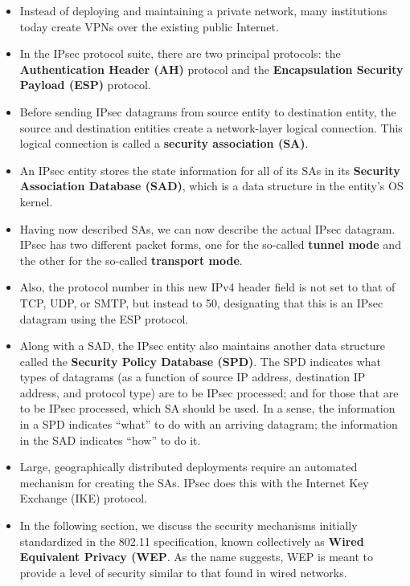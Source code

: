 \begin{itemize}
\item
Instead of deploying and maintaining a private network, many institutions today create VPNs over the existing public Internet.

\item
In the IPsec protocol suite, there are two principal protocols: the \textbf{Authentication Header (AH)} protocol and the \textbf{Encapsulation Security Payload (ESP)} protocol.

\item
Before sending IPsec datagrams from source entity to destination entity, the source and destination entities create a network-layer logical connection. This logical connection is called a \textbf{security association (SA)}.

\item
An IPsec entity stores the state information for all of its SAs in its \textbf{Security Association Database (SAD)}, which is a data structure in the entity's OS kernel.

\item
Having now described SAs, we can now describe the actual IPsec datagram. IPsec has two different packet forms, one for the so-called \textbf{tunnel mode} and the other for the so-called \textbf{transport mode}.

\item
Also, the protocol number in this new IPv4 header field is not set to that of TCP, UDP, or SMTP, but instead to 50, designating that this is an IPsec datagram using the ESP protocol.

\item
Along with a SAD, the IPsec entity also maintains another data structure called the \textbf{Security Policy Database (SPD)}. The SPD indicates what types of datagrams (as a function of source IP address, destination IP address, and protocol type) are to be IPsec processed; and for those that are to be IPsec processed, which SA should be used. In a sense, the information in a SPD indicates ``what'' to do with an arriving datagram; the information in the SAD indicates ``how'' to do it.

\item
Large, geographically distributed deployments require an automated mechanism for creating the SAs. IPsec does this with the Internet Key Exchange (IKE) protocol.

\item
In the following section, we discuss the security mechanisms initially standardized in the 802.11 specification, known collectively as \textbf{Wired Equivalent Privacy (WEP}. As the name suggests, WEP is meant to provide a level of security similar to that found in wired networks.


\end{itemize}
